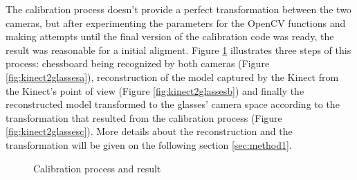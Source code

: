 \documentclass[msc, a4paper, classic, en]{ufbathesis}
\begin{document}
The calibration process doesn't provide a perfect transformation between the two cameras, but after experimenting the parameters for the OpenCV functions and making attempts until the final version of the calibration code was ready, the result was reasonable for a initial aligment. Figure \ref{fig:kinect2glasses} illustrates three steps of this process: chessboard being recognized by both cameras (Figure \ref{fig:kinect2glassesa}), reconstruction of the model captured by the Kinect from the Kinect's point of view (Figure \ref{fig:kinect2glassesb}) and finally the reconstructed model transformed to the glasses' camera space according to the transformation that resulted from the calibration process (Figure \ref{fig:kinect2glassesc}). More details about the reconstruction and the transformation will be given on the following section \ref{sec:method1}.

\begin{figure}
\centering
{}
\caption{Calibration process and result}
\label{fig:kinect2glasses}
\end{figure}
\end{document}
